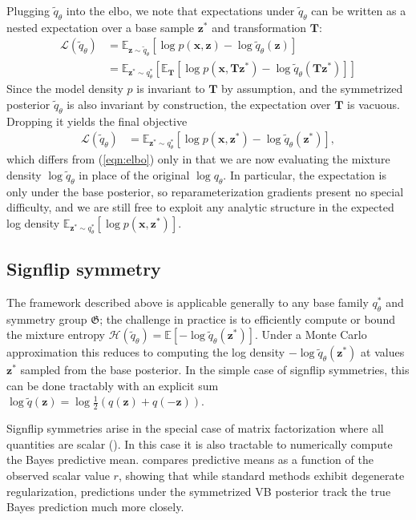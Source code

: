\documentclass{article}
\newcommand{\E}{\mathbb{E}}
\newcommand{\G}{\mathfrak{G}}
\renewcommand{\v}[1]{\mathbf{#1}}
\newcommand{\elbo}{{\sc elbo}}
\begin{document}
Plugging $\tilde{q}_\theta$ into the \elbo, we note that
expectations under $\tilde{q}_\theta$ can be written as a nested expectation
over a base sample $\v{z}^*$ and transformation $\v{T}$:
\begin{align*}
\mathcal{L}(\tilde{q}_\theta) &= \E_{\v{z}\sim \tilde{q}_\theta}\left[\log p(\v{x}, \v{z}) - \log \tilde{q}_\theta(\v{z})\right]\\
&= \E_{\v{z}^*\sim q^*_\theta}\left[\E_\v{T}\left[\log p(\v{x}, \v{T}\v{z}^*) -
  \log \tilde{q}_\theta(\v{T}\v{z}^*)\right]\right]
\end{align*}
Since the model density $p$ is invariant to $\v{T}$ by assumption, and
the symmetrized posterior $\tilde{q}_\theta$ is also
invariant by construction, the expectation over $\v{T}$ is vacuous. Dropping it yields the
final objective
\begin{align}
\mathcal{L}(\tilde{q}_\theta) &= \E_{\v{z}^*\sim q^*_\theta}\left[\log p(\v{x}, \v{z}^*) - \log \tilde{q}_\theta(\v{z}^*)\right]\label{eqn:symmetrized_elbo},
\end{align}
which differs from (\ref{eqn:elbo}) only in that we are now
evaluating the mixture density $\log \tilde{q}_\theta$ in place of the
original $\log q_\theta$. In particular, the expectation is
only under the base posterior, so reparameterization
gradients present no special difficulty, and we are still free to
exploit any analytic structure in the expected log density $\E_{\v{z}^*\sim q^*_\theta}\left[\log p(\v{x}, \v{z}^*)\right]$. 

\subsection{Signflip symmetry}

The framework described above is applicable generally to any base
family $q^*_\theta$ and symmetry group $\G$; the challenge in practice is to efficiently
compute or bound the mixture entropy $\mathcal{H}(\tilde{q}_\theta) =
\E[-\log \tilde{q}_\theta(\v{z}^*)]$. Under a Monte Carlo approximation this
reduces to computing the log density $-\log \tilde{q}_\theta(\v{z}^*)$
at values $\v{z}^*$ sampled from the base posterior. In the simple case of signflip
symmetries, this can be done tractably with an explicit sum $\log
\tilde{q}(\v{z}) = \log \frac{1}{2}\left(q(\v{z}) + q(-\v{z})\right)$.

Signflip symmetries arise in the special case of matrix
factorization where all quantities are scalar
(). In this case it is also tractable to
numerically compute the Bayes predictive mean. 
compares predictive means as a function of the observed scalar value $r$, showing
that while standard methods exhibit degenerate regularization,
predictions under the symmetrized VB posterior track the true Bayes
prediction much more closely. 
\end{document}
